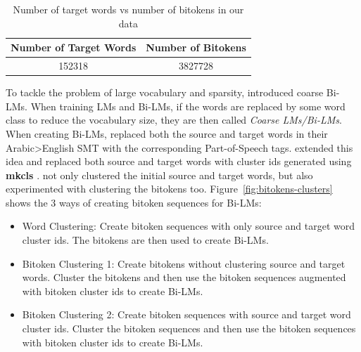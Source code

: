 \begin{table}
	\begin{center}
		\begin{tabular}{|c|c|}
			\hline
			\textbf{Number of Target Words} & \textbf{Number of Bitokens}\\\hline
			152318 & 3827728\\\hline
		\end{tabular}
		\caption{Number of target words vs number of bitokens in our data}
		\label{table:vocab-comparison}		
	\end{center}
\end{table}


To tackle the problem of large vocabulary and sparsity, \cite{Niehues2011} introduced coarse Bi-LMs. When training LMs and Bi-LMs, if the words are replaced by some word class to reduce the vocabulary size, they are then called \textit{Coarse LMs/Bi-LMs}. When creating Bi-LMs, \cite{Niehues2011} replaced both the source and target words in their Arabic>English SMT with the corresponding Part-of-Speech tags. \cite{Stewart2014} extended this idea and replaced both source and target words with cluster ids generated using \textbf{mkcls} \cite{Och1995}. \cite{Stewart2014} not only clustered the initial source and target words, but also experimented with clustering the bitokens too. Figure~\ref{fig:bitokens-clusters} shows the 3 ways of creating bitoken sequences for Bi-LMs:
\begin{itemize}
	\item Word Clustering: Create bitoken sequences with only source and target word cluster ids. The bitokens are then used to create Bi-LMs.
	\item Bitoken Clustering 1: Create bitokens without clustering source and target words. Cluster the bitokens and then use the bitoken sequences augmented with bitoken cluster ids to create Bi-LMs.
	\item Bitoken Clustering 2: Create bitoken sequences with source and target word cluster ids. Cluster the bitoken sequences and then use the bitoken sequences with bitoken cluster ids to create Bi-LMs.
\end{itemize}

